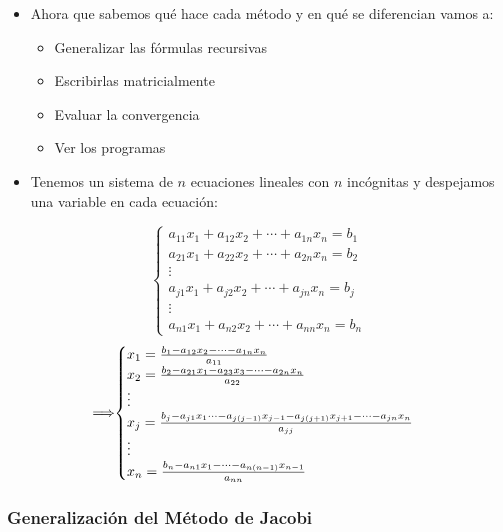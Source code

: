 \documentclass[openany]{book}
\providecommand{\tightlist}{%
  \setlength{\itemsep}{0pt}\setlength{\parskip}{0pt}}
\begin{document}
\begin{itemize}
\item
  Ahora que sabemos qué hace cada método y en qué se diferencian vamos a:

  \begin{itemize}
  \tightlist
  \item
    Generalizar las fórmulas recursivas
  \item
    Escribirlas matricialmente
  \item
    Evaluar la convergencia
  \item
    Ver los programas
  \end{itemize}
\item
  Tenemos un sistema de \(n\) ecuaciones lineales con \(n\) incógnitas y despejamos una variable en cada ecuación:
\end{itemize}

\[
\begin{cases} 
a_{11}x_1 + a_{12}x_2 + \cdots + a_{1n}x_n = b_1 \\
a_{21}x_1 + a_{22}x_2 + \cdots + a_{2n}x_n = b_2 \\
\vdots \\
a_{j1}x_1 + a_{j2}x_2 + \cdots + a_{jn}x_n = b_j \\
\vdots \\
a_{n1}x_1 + a_{n2}x_2 + \cdots + a_{nn}x_n = b_n
\end{cases}
\]
\[
\implies\hspace{-0.2cm}
\begin{cases} 
x_1 = \frac{b_1 - a_{12}x_2 - \cdots - a_{1n}x_n}{ a_{11}}\\
x_2 = \frac{b_2 - a_{21}x_1 - a_{23}x_3 - \cdots - a_{2n}x_n}{ a_{22}}\\
\vdots \\
x_j = \frac{b_j - a_{j1}x_1 \cdots - a_{j(j-1)}x_{j-1} - a_{j(j+1)}x_{j+1} - \cdots - a_{jn}x_n}{ a_{jj}}\\
\vdots \\
x_n = \frac{b_n - a_{n1}x_1 - \cdots - a_{n(n-1)}x_{n-1}}{a_{nn}}\\
\end{cases}
\]

\hypertarget{generalizaciuxf3n-del-muxe9todo-de-jacobi}{%
\subsubsection{Generalización del Método de Jacobi}\label{generalizaciuxf3n-del-muxe9todo-de-jacobi}}
\end{document}
